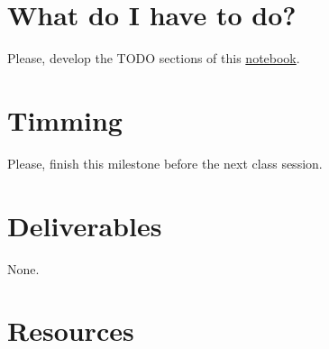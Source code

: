 \section{What do I have to do?}

\begin{comment}
Please, using
\href{https://github.com/Sistemas-Multimedia/Sistemas-Multimedia.github.io/blob/master/milestones/08-DWT/DWT_filters_analysis.ipynb}{this
  notebook}, determine the frequency and phase responses of the
\href{http://wavelets.pybytes.com/wavelet/db20/}{Daubechies 20} and
\href{http://wavelets.pybytes.com/wavelet/bior6.8/}{Biorthogonal-6.8}
filters. Determine also their relative gains, using the energy of the
signal resulting of applying the synthesis transform to the impulse
signal. The energy of a signal ${\mathbf x}$ is found by
\begin{equation}
  \langle {\mathbf x}, {\mathbf x}\rangle =  \sum_{i}{{\mathbf x}_i^2}.
\end{equation}
\end{comment}

Please, develop the TODO sections of this
\href{https://github.com/Sistemas-Multimedia/Sistemas-Multimedia.github.io/blob/master/milestones/08-DWT/DWT_compression.ipynb}{notebook}.

\section{Timming}

Please, finish this milestone before the next class session.

\section{Deliverables}

None.

\section{Resources}

\renewcommand{\addcontentsline}[3]{}%

